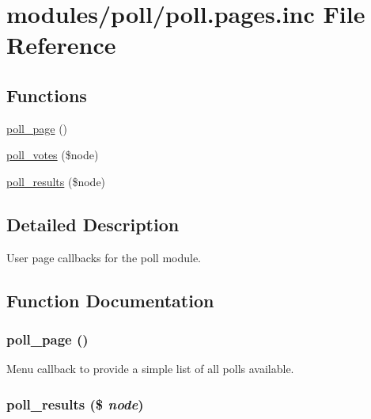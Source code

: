 \hypertarget{poll_8pages_8inc}{
\section{modules/poll/poll.pages.inc File Reference}
\label{poll_8pages_8inc}
}
\subsection*{Functions}
\begin{CompactItemize}
\item 
\hyperlink{poll_8pages_8inc_a3710efcad2e049b1358cab8fc689270}{poll\_\-page} ()
\item 
\hyperlink{poll_8pages_8inc_ba05cafb193346dcc10f8add20b7a372}{poll\_\-votes} (\$node)
\item 
\hyperlink{poll_8pages_8inc_d54476ab27ee3bb22df58380aa53105d}{poll\_\-results} (\$node)
\end{CompactItemize}


\subsection{Detailed Description}
User page callbacks for the poll module. 

\subsection{Function Documentation}
\hypertarget{poll_8pages_8inc_a3710efcad2e049b1358cab8fc689270}{
\subsubsection[{poll\_\-page}]{\setlength{\rightskip}{0pt plus 5cm}poll\_\-page ()}}
\label{poll_8pages_8inc_a3710efcad2e049b1358cab8fc689270}


Menu callback to provide a simple list of all polls available. \hypertarget{poll_8pages_8inc_d54476ab27ee3bb22df58380aa53105d}{
\subsubsection[{poll\_\-results}]{\setlength{\rightskip}{0pt plus 5cm}poll\_\-results (\$ {\em node})}}
\label{poll_8pages_8inc_d54476ab27ee3bb22df58380aa53105d}


